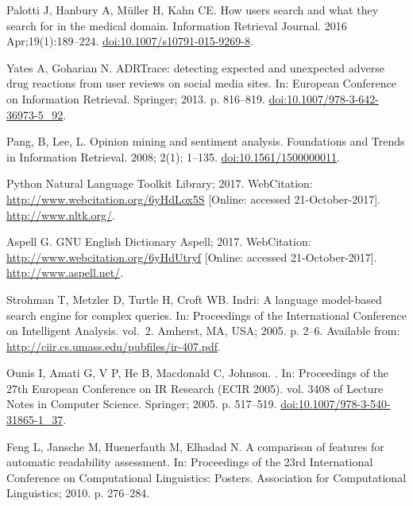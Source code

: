 \documentclass[10pt,a4paper]{article}
\begin{document}
\begin{thebibliography}{10}
	Palotti J, Hanbury A, M{\"u}ller H, Kahn CE.
	\newblock How users search and what they search for in the medical domain.
	\newblock Information Retrieval Journal. 2016 Apr;19(1):189--224.
	\newblock \href {http://dx.doi.org/10.1007/s10791-015-9269-8}
	{doi:10.1007/s10791-015-9269-8}.
	
	Yates A, Goharian N.
	\newblock ADRTrace: detecting expected and unexpected adverse drug reactions
	from user reviews on social media sites.
	\newblock In: European Conference on Information Retrieval. Springer; 2013. p.
	816--819.
	\newblock \href {http://dx.doi.org/10.1007/978-3-642-36973-5\_92}
	{doi:10.1007/978-3-642-36973-5\_92}.
	
    Pang, B, Lee, L.
    \newblock Opinion mining and sentiment analysis.
    \newblock Foundations and Trends in Information Retrieval. 2008; 2(1); 1--135.
    \newblock \href {http://dx.doi.org/10.1561/1500000011}
    {doi:10.1561/1500000011}.

	Python Natural Language Toolkit Library; 2017.
	\newblock WebCitation: \url{http://www.webcitation.org/6yHdLox5S} [Online:
	accessed 21-October-2017].
	\newblock \url{http://www.nltk.org/}.
	
	Aspell G. GNU English Dictionary Aspell; 2017.
	\newblock WebCitation: \url{http://www.webcitation.org/6yHdUtryf} [Online:
	accessed 21-October-2017].
	\newblock \url{http://www.aspell.net/}.
	
	Strohman T, Metzler D, Turtle H, Croft WB.
	\newblock Indri: A language model-based search engine for complex queries.
	\newblock In: Proceedings of the International Conference on Intelligent
	Analysis. vol.~2. Amherst, MA, USA; 2005. p. 2--6.
	\newblock Available from: \url{http://ciir.cs.umass.edu/pubfiles/ir-407.pdf}.
	
	Ounis I, Amati G, V P, He B, Macdonald C, Johnson.
	.
	\newblock In: {Proceedings of the 27th European Conference on IR Research (ECIR
		2005)}. vol. 3408 of Lecture Notes in Computer Science. Springer; 2005. p.
	517--519.
	\newblock \href {http://dx.doi.org/10.1007/978-3-540-31865-1\_37}
	{doi:10.1007/978-3-540-31865-1\_37}.
	
	Feng L, Jansche M, Huenerfauth M, Elhadad N.
	\newblock A comparison of features for automatic readability assessment.
	\newblock In: Proceedings of the 23rd International Conference on Computational
	Linguistics: Posters. Association for Computational Linguistics; 2010. p.
	276--284.
	

\end{thebibliography}
\end{document}
